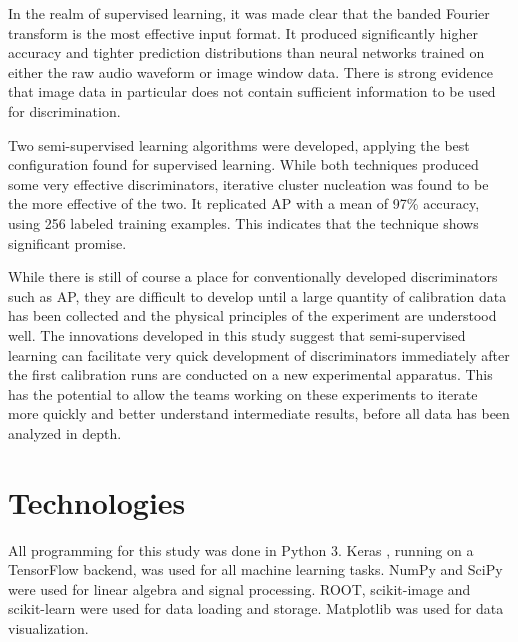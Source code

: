 \documentclass[10pt]{article}
\begin{document}
In the realm of supervised learning, it was made clear that the banded Fourier transform is the most effective input format. It produced significantly higher accuracy and tighter prediction distributions than neural networks trained on either the raw audio waveform or image window data. There is strong evidence that image data in particular does not contain sufficient information to be used for discrimination.

Two semi-supervised learning algorithms were developed, applying the best configuration found for supervised learning. While both techniques produced some very effective discriminators, iterative cluster nucleation was found to be the more effective of the two. It replicated AP with a mean of 97\% accuracy, using 256 labeled training examples. This indicates that the technique shows significant promise.

While there is still of course a place for conventionally developed discriminators such as AP, they are difficult to develop until a large quantity of calibration data has been collected and the physical principles of the experiment are understood well. The innovations developed in this study suggest that semi-supervised learning can facilitate very quick development of discriminators immediately after the first calibration runs are conducted on a new experimental apparatus. This has the potential to allow the teams working on these experiments to iterate more quickly and better understand intermediate results, before all data has been analyzed in depth.

\section{Technologies}

All programming for this study was done in Python 3. Keras \cite{keras}, running on a TensorFlow backend, was used for all machine learning tasks. NumPy and SciPy were used for linear algebra and signal processing. ROOT, scikit-image and scikit-learn were used for data loading and storage. Matplotlib was used for data visualization.

\printbibliography
\end{document}
